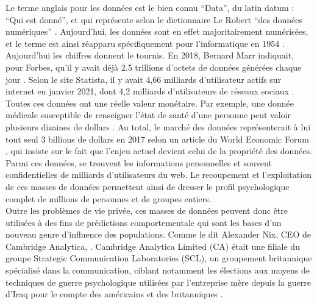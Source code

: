 \documentclass{article}
\begin{document}
Le terme anglais pour les données est le bien connu “Data”, du latin datum : “Qui est donné”, et qui représente selon le dictionnaire Le Robert “des données numériques” \cite{noauthor_undated-cy}. Aujourd’hui, les données sont en effet majoritairement numérisées, et le terme est ainsi réapparu spécifiquement pour l’informatique en 1954 \cite{Marr2018-dd}. Aujourd’hui les chiffres donnent le tournis. En 2018, Bernard Marr indiquait, pour Forbes, qu’il y avait déjà 2.5 trillions d’octets de données générées chaque jour \cite{Marr2018-dd}. Selon le site Statista, il y avait 4,66 milliards d’utilisateur actifs sur internet en janvier 2021, dont 4,2 milliards d’utilisateurs de réseaux sociaux \cite{noauthor_undated-vd}.\\

Toutes ces données ont une réelle valeur monétaire. Par exemple, une donnée médicale susceptible de renseigner l’état de santé d’une personne peut valoir plusieurs dizaines de dollars \cite{Benyayer2017-xt}. Au total, le marché des données représenterait à lui tout seul 3 billions de dollars en 2017 selon un article du World Economic Forum \cite{noauthor_undated-yi}, qui insiste sur le fait que l’enjeu actuel devient celui de la propriété des données. Parmi ces données, se trouvent les informations personnelles et souvent confidentielles de milliards d’utilisateurs du web. Le recoupement et l’exploitation de ces masses de données permettent ainsi de dresser le profil psychologique complet de millions de personnes et de groupes entiers.\\

Outre les problèmes de vie privée, ces masses de données peuvent donc être utilisées à des fins de prédictions comportementale qui sont les bases d’un nouveau genre d’influence des populations. Comme le dit Alexander Nix, CEO de Cambridge Analytica,  \cite{Cheshire2016-xi}. Cambridge Analytica Limited (CA) était une filiale du groupe Strategic Communication Laboratories (SCL), un groupement britannique spécialisé dans la communication, ciblant notamment les élections aux moyens de techniques de guerre psychologique utilisées par l’entreprise mère depuis la guerre d’Iraq pour le compte des américains et des britanniques \cite{Barry2018-zs}.\\
\end{document}
